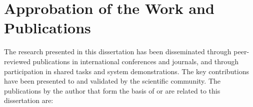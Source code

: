 \section*{Approbation of the Work and Publications}
\label{sec:synopsis:approbation}
The research presented in this dissertation has been disseminated through peer-reviewed publications in international conferences and journals, and through participation in shared tasks and system demonstrations. The key contributions have been presented to and validated by the scientific community.
The publications by the author that form the basis of or are related to this dissertation are:
